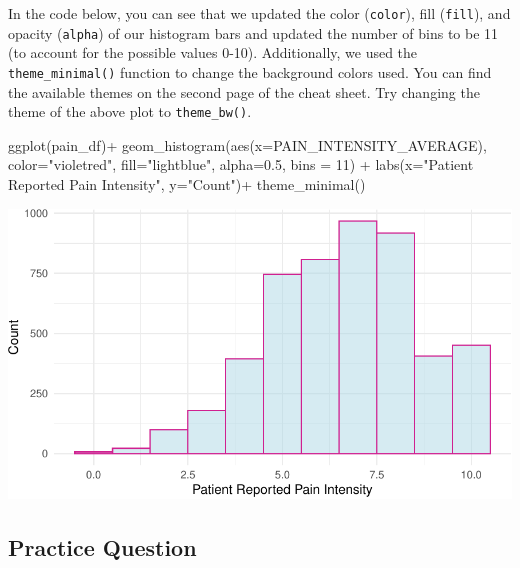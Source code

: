 \documentclass[
  letterpaper,
]{krantz}
\makeatletter
\newenvironment{Shaded}{\begin{snugshade}}{\end{snugshade}}
\newcommand{\AttributeTok}[1]{\textcolor[rgb]{0.40,0.45,0.13}{#1}}
\newcommand{\DecValTok}[1]{\textcolor[rgb]{0.68,0.00,0.00}{#1}}
\newcommand{\FloatTok}[1]{\textcolor[rgb]{0.68,0.00,0.00}{#1}}
\newcommand{\FunctionTok}[1]{\textcolor[rgb]{0.28,0.35,0.67}{#1}}
\newcommand{\NormalTok}[1]{\textcolor[rgb]{0.00,0.23,0.31}{#1}}
\newcommand{\SpecialCharTok}[1]{\textcolor[rgb]{0.37,0.37,0.37}{#1}}
\newcommand{\StringTok}[1]{\textcolor[rgb]{0.13,0.47,0.30}{#1}}
\newenvironment{kframe}{%
\medskip{}
\setlength{\fboxsep}{.8em}
 \def\at@end@of@kframe{}%
 \ifinner\ifhmode%
  \def\at@end@of@kframe{\end{minipage}}%
  \begin{minipage}{\columnwidth}%
 \fi\fi%
 \def\FrameCommand##1{\hskip\@totalleftmargin \hskip-\fboxsep
 \colorbox{shadecolor}{##1}\hskip-\fboxsep
     \hskip-\linewidth \hskip-\@totalleftmargin \hskip\columnwidth}%
 \MakeFramed {\advance\hsize-\width
   \@totalleftmargin\z@ \linewidth\hsize
   \@setminipage}}%
 {\par\unskip\endMakeFramed%
 \at@end@of@kframe}
\renewenvironment{Shaded}{\begin{kframe}}{\end{kframe}}
\makeatother
\begin{document}
In the code below, you can see that we updated the color
(\texttt{color}), fill (\texttt{fill}), and opacity (\texttt{alpha}) of
our histogram bars and updated the number of bins to be 11 (to account
for the possible values 0-10). Additionally, we used the
\texttt{theme\_minimal()} function to change the background colors used.
You can find the available themes on the second page of the cheat sheet.
Try changing the theme of the above plot to \texttt{theme\_bw()}.

\begin{Shaded}
\begin{Highlighting}[]
\FunctionTok{ggplot}\NormalTok{(pain\_df)}\SpecialCharTok{+}
  \FunctionTok{geom\_histogram}\NormalTok{(}\FunctionTok{aes}\NormalTok{(}\AttributeTok{x=}\NormalTok{PAIN\_INTENSITY\_AVERAGE), }\AttributeTok{color=}\StringTok{"violetred"}\NormalTok{, }
                 \AttributeTok{fill=}\StringTok{"lightblue"}\NormalTok{, }\AttributeTok{alpha=}\FloatTok{0.5}\NormalTok{, }\AttributeTok{bins =} \DecValTok{11}\NormalTok{) }\SpecialCharTok{+}
  \FunctionTok{labs}\NormalTok{(}\AttributeTok{x=}\StringTok{"Patient Reported Pain Intensity"}\NormalTok{, }\AttributeTok{y=}\StringTok{"Count"}\NormalTok{)}\SpecialCharTok{+}
  \FunctionTok{theme\_minimal}\NormalTok{()}
\end{Highlighting}
\end{Shaded}

\begin{center}
\includegraphics[width=1\textwidth,height=\textheight]{book/visualization_ggplot_files/figure-pdf/unnamed-chunk-6-1.pdf}
\end{center}

\subsection{Practice Question}\label{practice-question-13}
\end{document}
